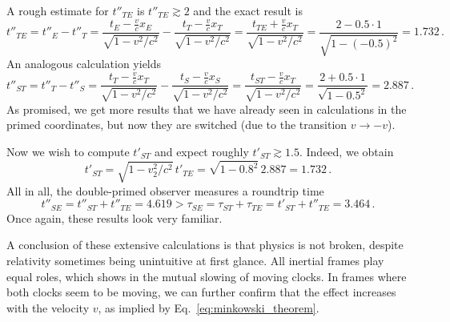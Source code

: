\documentclass[../relativity_main.tex]{subfiles}
\begin{document}
\begin{ex}
\begin{itemize}
		A rough estimate for $t''_{TE}$ is $t''_{TE} \gtrsim 2$ and the exact result is
		\begin{equation*}
			t''_{TE} = t''_E - t''_T = \frac{t_E - \frac{v}{c} x_E}{\sqrt{1 - v^2 / c^2}} - \frac{t_T - \frac{v}{c} x_T}{\sqrt{1 - v^2 / c^2}} = \frac{t_{TE} + \frac{v}{c} x_T}{\sqrt{1 - v^2 / c^2}} = \frac{2 - 0.5 \cdot 1}{\sqrt{1 - (-0.5)^2}} = 1.732 \, .
		\end{equation*}
		An analogous calculation yields
		\begin{equation*}
			t''_{ST} = t''_T - t''_S = \frac{t_T - \frac{v}{c} x_T}{\sqrt{1 - v^2 / c^2}} - \frac{t_S - \frac{v}{c} x_S}{\sqrt{1 - v^2 / c^2}} = \frac{t_{ST} - \frac{v}{c} x_T}{\sqrt{1 - v^2 / c^2}} = \frac{2 + 0.5 \cdot 1}{\sqrt{1 - 0.5^2}} = 2.887 \, .
		\end{equation*}
		As promised, we get more results that we have already seen in calculations in the primed coordinates, but now they are switched (due to the transition $v \rightarrow -v$).
	
		Now we wish to compute $t'_{ST}$ and expect roughly $t'_{ST} \gtrsim 1.5$. Indeed, we obtain
		\begin{equation*}
			t'_{ST} = \sqrt{1 - v_2^2 / c^2} \, t'_{TE} = \sqrt{1 - 0.8^2} \, 2.887 = 1.732 \, .
		\end{equation*}
		All in all, the double-primed observer measures a roundtrip time
		\begin{equation*}
			t''_{SE} = t''_{ST} + t''_{TE} = 4.619 > \tau_{SE} = \tau_{ST} + \tau_{TE} = t'_{ST} + t''_{TE} = 3.464 \, .
		\end{equation*}
		Once again, these results look very familiar. 
	\end{itemize}
	
	
	
	A conclusion of these extensive calculations is that physics is not broken, despite relativity sometimes being unintuitive at first glance. All inertial frames play equal roles, which shows in the mutual slowing of moving clocks. In frames where both clocks seem to be moving, we can further confirm that the effect increases with the velocity $v$, as implied by Eq.~\eqref{eq:minkowski_theorem}.
	

\end{ex}
\end{document}
